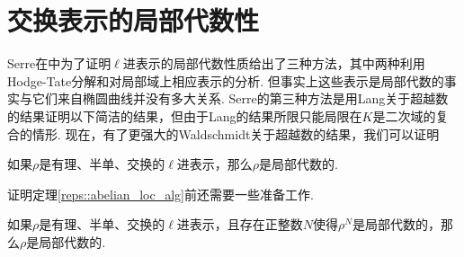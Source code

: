 \section{交换表示的局部代数性}

Serre在{\parencite{serre1997abelian}}中为了证明$\ell$进表示的局部代数性质给出了三种方法，其中两种利用Hodge-Tate分解和对局部域上相应表示的分析. 但事实上这些表示是局部代数的事实与它们来自椭圆曲线并没有多大关系. Serre的第三种方法是用Lang关于超越数的结果证明以下简洁的结果，但由于Lang的结果所限只能局限在$K$是二次域的复合的情形. 现在，有了更强大的Waldschmidt关于超越数的结果，我们可以证明

\begin{cthm}
    如果$\rho$是有理、半单、交换的$\ell$进表示，那么$\rho$是局部代数的. \label{reps::abelian_loc_alg}
\end{cthm}

证明定理\ref{reps::abelian_loc_alg}前还需要一些准备工作.

\begin{cprop}
    如果$\rho$是有理、半单、交换的$\ell$进表示，且存在正整数$N$使得$\rho^N$是局部代数的，那么$\rho$是局部代数的. \label{reps::power_N}
\end{cprop}

